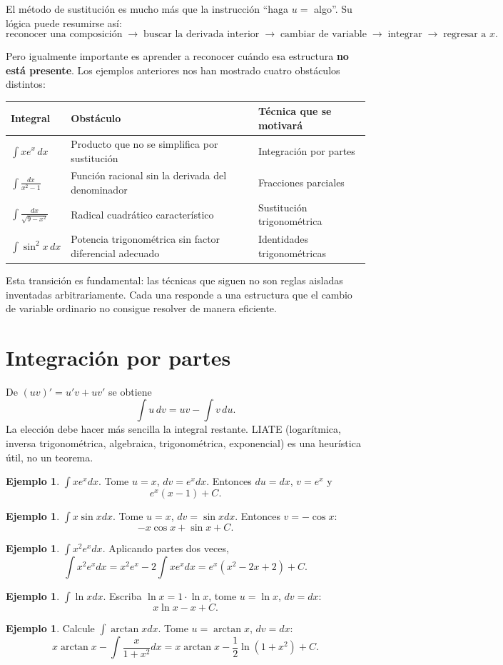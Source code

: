 \documentclass[12pt]{article}
\theoremstyle{definition}\newtheorem{definicion}[teorema]{Definición}\newtheorem{ejemplo}[teorema]{Ejemplo}\newtheorem{ejercicio}[teorema]{Ejercicio}
\theoremstyle{remark}\newtheorem*{observacion}{Observación}\newtheorem*{advertencia}{Advertencia}\newtheorem*{estrategia}{Estrategia}
\begin{document}
El método de sustitución es mucho más que la instrucción ``haga $u=$ algo''. Su lógica puede resumirse así:
\[
\boxed{\text{reconocer una composición}\;\longrightarrow\;
\text{buscar la derivada interior}\;\longrightarrow\;
\text{cambiar de variable}\;\longrightarrow\;
\text{integrar}\;\longrightarrow\;
\text{regresar a }x.}
\]

Pero igualmente importante es aprender a reconocer cuándo esa estructura \textbf{no está presente}. Los ejemplos anteriores nos han mostrado cuatro obstáculos distintos:
\begin{center}
\begin{tabular}{p{}p{}p{}}
\toprule
\textbf{Integral} & \textbf{Obstáculo} & \textbf{Técnica que se motivará}\\
\midrule
$\int xe^x\,dx$ & Producto que no se simplifica por sustitución & Integración por partes\\
$\int\frac{dx}{x^2-1}$ & Función racional sin la derivada del denominador & Fracciones parciales\\
$\int\frac{dx}{\sqrt{9-x^2}}$ & Radical cuadrático característico & Sustitución trigonométrica\\
$\int\sin^2x\,dx$ & Potencia trigonométrica sin factor diferencial adecuado & Identidades trigonométricas\\
\bottomrule
\end{tabular}
\end{center}

Esta transición es fundamental: las técnicas que siguen no son reglas aisladas inventadas arbitrariamente. Cada una responde a una estructura que el cambio de variable ordinario no consigue resolver de manera eficiente.


\section{Integración por partes}
De $(uv)'=u'v+uv'$ se obtiene
\[\boxed{\int u\,dv=uv-\int v\,du}.\]
La elección debe hacer más sencilla la integral restante. LIATE (logarítmica, inversa trigonométrica, algebraica, trigonométrica, exponencial) es una heurística útil, no un teorema.
\begin{ejemplo}$\int xe^xdx$. Tome $u=x$, $dv=e^xdx$. Entonces $du=dx$, $v=e^x$ y
\[\boxed{e^x(x-1)+C}.\]\end{ejemplo}
\begin{ejemplo}$\int x\sin xdx$. Tome $u=x$, $dv=\sin xdx$. Entonces $v=-\cos x$:
\[\boxed{-x\cos x+\sin x+C}.\]\end{ejemplo}
\begin{ejemplo}$\int x^2e^xdx$. Aplicando partes dos veces,
\[\int x^2e^xdx=x^2e^x-2\int xe^xdx=\boxed{e^x(x^2-2x+2)+C}.\]\end{ejemplo}
\begin{ejemplo}$\int\ln xdx$. Escriba $\ln x=1\cdot\ln x$, tome $u=\ln x$, $dv=dx$:
\[\boxed{x\ln x-x+C}.\]\end{ejemplo}
\begin{ejemplo}Calcule $\int\arctan xdx$. Tome $u=\arctan x$, $dv=dx$:
\[x\arctan x-\int\frac{x}{1+x^2}dx=\boxed{x\arctan x-\frac12\ln(1+x^2)+C}.\]\end{ejemplo}
\end{document}

